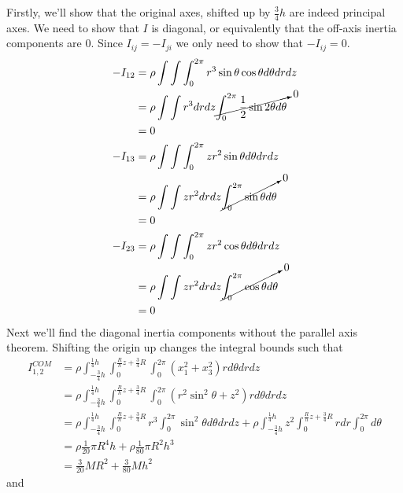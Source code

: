 Firstly, we'll show that the original axes, shifted up by $\frac{3}{4}h$ are indeed principal axes. We need to show that $I$ is diagonal, or equivalently that the off-axis inertia components are $0$. Since $I_{ij} = -I_{ji}$ we only need to show that $-I_{ij} = 0$.
\begin{equation}
\begin{split}
    -I_{12} &= \rho \int \int \int_0^{2\pi} r^3\sin \theta \cos \theta d\theta dr dz\\
    &= \rho \int \int r^3 dr dz \cancelto{0}{\int_0^{2\pi} \frac{1}{2}\sin 2\theta d\theta} \\
    &= 0\\
    -I_{13} &= \rho \int \int \int_0^{2\pi} zr^2 \sin \theta d\theta dr dz\\
    &= \rho \int \int zr^2 dr dz \cancelto{0}{\int_0^{2\pi}\sin \theta d\theta}\\
    &= 0\\
    -I_{23} &= \rho \int \int \int_0^{2\pi} zr^2 \cos \theta d\theta dr dz\\
    &= \rho \int \int zr^2 dr dz \cancelto{0}{\int_0^{2\pi}\cos \theta d \theta}\\
    &= 0\\
\end{split}
\end{equation}
Next we'll find the diagonal inertia components without the parallel axis theorem. Shifting the origin up changes the integral bounds such that
\begin{equation}
\begin{split}
    I_{1, 2}^{COM} &= \rho \int_{-\frac{3}{4}h}^{\frac{1}{4}h} \int_0^{\frac{R}{h}z+\frac{3}{4}R} \int_0^{2\pi} (x_1^2 + x_3^2) rd\theta dr dz\\
    &=\rho \int_{-\frac{3}{4}h}^{\frac{1}{4}h} \int_0^{\frac{R}{h}z+\frac{3}{4}R} \int_0^{2\pi} (r^2 \sin^2 \theta + z^2) rd\theta dr dz\\
    &=\rho \int_{-\frac{3}{4}h}^{\frac{1}{4}h} \int_0^{\frac{R}{h}z+\frac{3}{4}R} r^3 \int_0^{2\pi}\sin^2 \theta d\theta dr dz + \rho \int_{-\frac{3}{4}h}^{\frac{1}{4}h} z^2 \int_0^{\frac{R}{h}z+\frac{3}{4}R} r dr \int_0^{2\pi} d\theta\\
    &= \rho \frac{1}{20}\pi R^4 h + \rho \frac{1}{80}\pi R^2 h^3\\
    &= \frac{3}{20}MR^2+\frac{3}{80}Mh^2
    \end{split}
\end{equation}
and
